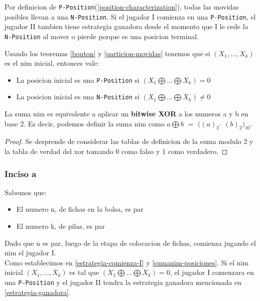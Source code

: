 \begin{corollary}
	\label{estrategia-comienza-I}
	Por definicion de \texttt{P-Position}(\ref{position-characterization}), todas las movidas posibles llevan a una \texttt{N-Position}. Si el jugador I comienza en una \texttt{P-Position}, el jugador II tambien tiene estrategia ganadora desde el momento que I le cede la \texttt{N-Position} al mover o pierde porque es una posicion terminal.
\end{corollary}

\begin{corollary}
	\label{sumanim-posiciones}
	Usando los teoremas \ref{bouton} y \ref{particion-movidas} tenemos que si $(X_1, \dots, X_k)$ es el nim inicial, entonces vale:
	\begin{itemize}
		\item La posicion inicial es una \texttt{P-Position} si $(X_1 \bigoplus \dots \bigoplus X_k) = 0$ 
		\item La posicion inicial es una \texttt{N-Position} si $(X_1 \bigoplus \dots \bigoplus X_k) \neq 0$ 
	\end{itemize}
\end{corollary}

\begin{theorem}
\label{equiv-nim-xor}
	La suma nim es equivalente a aplicar un \textbf{bitwise XOR} a los numeros a y b en base 2. Es decir, podemos definir la suma nim como $a \bigoplus b$ $ = $ $( (a)_2$ $\hat{}$ $(b)_2 )_{10}$.
\end{theorem}
\begin{proof}
	 Se desprende de considerar las tablas de definicion de la suma modulo 2 y la tabla de verdad del xor tomando 0 como falso y 1 como verdadero.
\end{proof}

\subsubsection{Inciso a}
Sabemos que:
\begin{itemize}
	\item El numero n, de fichas en la bolsa, es par
	\item El numero k, de pilas, es par 
\end{itemize}

Dado que n es par, luego de la etapa de colocacion de fichas, comienza jugando el nim el jugador I.\\
Como establecimos en \ref{estrategia-comienza-I} y \ref{sumanim-posiciones}. Si el nim inicial $(X_1, \dots, X_k)$ es tal que $(X_1 \bigoplus \dots \bigoplus X_k) = 0$, el jugador I comenzara en una \texttt{P-Position} y el jugador II tendra la estrategia ganadora mencionada en \ref{estrategia-ganadora}.\\

